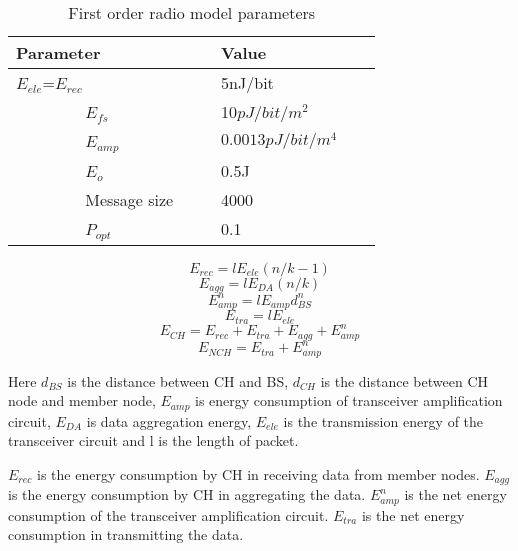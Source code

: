 \documentclass[journal]{IEEEtran}
\begin{document}
\begin{table}
\centering
\caption{First order radio model parameters}
\begin{tabular}{|l|l|}

\hline
Parameter        & Value            \\
\hline
$E_{ele}$=$E_{rec}$ & 5nJ/bit          \\
\hline        
$E_{fs}$           & 10$pJ/bit/m^2 $    \\
\hline        
$E_{amp}$          & $0.0013pJ/bit/m^4$ \\
\hline        
$E_o$            & 0.5J             \\
\hline        
Message size     & 4000             \\
\hline        
$P_{opt}$          & 0.1              \\
\hline
\end{tabular}
\end{table}

\begin{equation}
E_{rec}={lE_{ele}(n/k-1)}
\end{equation}
\begin{equation}
E_{agg}={{lE_{DA}}(n/k)}
\end{equation}
\begin{equation}
{E_{amp}^n}={lE_{amp}d_{BS}^n}
\end{equation}
\begin{equation}
E_{tra}={lE_{ele}}
\end{equation}
\begin{equation}
E_{CH}={E_{rec}+E_{tra}+E_{agg}+{E_{amp}^n}}
\end{equation}
\begin{equation}
E_{NCH}={E_{tra}+{E_{amp}^n}}
\end{equation}

Here $d_{BS}$ is the distance between CH and BS, $d_{CH}$ is the distance between CH node and member node, $E_{amp}$ is energy consumption of transceiver amplification circuit, $E_{DA}$ is data aggregation energy, $E_{ele}$ is the transmission energy of the transceiver circuit and l is the length of packet.

${E_{rec}}$ is the energy consumption by CH in receiving data from member nodes. $E_{agg}$ is the energy consumption by CH in aggregating the data. ${E_{amp}^n}$ is the net energy consumption of the transceiver amplification circuit. $E_{tra}$ is the net energy consumption in transmitting the data.
\end{document}
